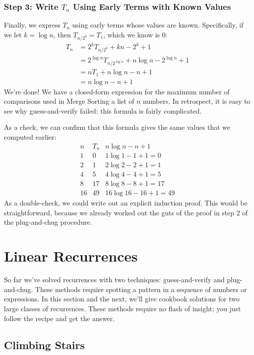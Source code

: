 \subsubsection*{Step 3:  Write $T_n$ Using Early Terms with Known Values}

Finally, we express $T_n$ using early terms whose values are known.
Specifically, if we let $k = \log n$, then $T_{n/2^k} = T_1$, which we
know is 0:
\begin{align*}
T_n & = 2^k T_{n/2^k} + kn - 2^k + 1 \\
  & = 2^{\log n} T_{n/2^{\log n}} + n \log n - 2^{\log n} + 1 \\
  & = n T_1 + n \log n - n + 1 \\
  & = n \log n - n + 1
\end{align*}
We're done!  We have a closed-form expression for the maximum number
of comparisons used in Merge Sorting a list of $n$ numbers.  In
retrospect, it is easy to see why guess-and-verify failed:  this
formula is fairly complicated.

As a check, we can confirm that this formula gives the same values
that we computed earlier:
\[
\begin{array}{c|c|c}
n & T_n & n \log n - n + 1 \\ \hline
1 & 0 & 1 \log 1 - 1 + 1 = 0 \\
2 & 1 & 2 \log 2 - 2 + 1 = 1 \\
4 & 5 & 4 \log 4 - 4 + 1 = 5 \\
8 & 17 & 8 \log 8 - 8 + 1 = 17 \\
16 & 49 & 16 \log 16 - 16 + 1 = 49
\end{array}
\]
As a double-check, we could write out an explicit induction proof.
This would be straightforward, because we already worked out the guts
of the proof in step 2 of the plug-and-chug procedure.

\section{Linear Recurrences}

So far we've solved recurrences with two techniques: guess-and-verify
and plug-and-chug.  These methods require spotting a pattern in a
sequence of numbers or expressions.  In this section and the next,
we'll give cookbook solutions for two large classes of recurrences.
These methods require no flash of insight; you just follow the recipe
and get the answer.

\subsection{Climbing Stairs}

